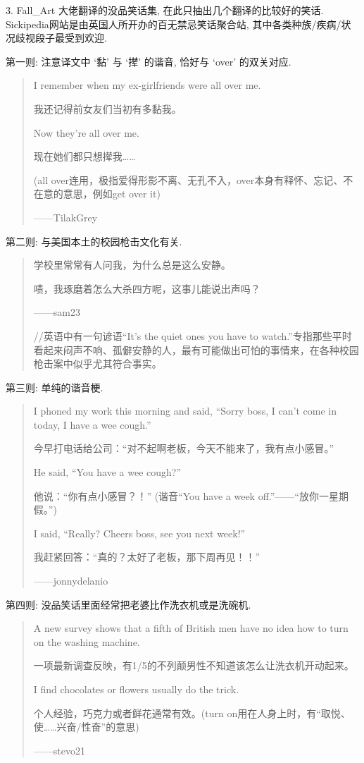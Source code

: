 \documentclass[a4paper, 12pt, UTF8]{article}
\begin{document}
3. Fall\_Art 大佬翻译的没品笑话集, 在此只抽出几个翻译的比较好的笑话. Sickipedia网站是由英国人所开办的百无禁忌笑话聚合站, 其中各类种族/疾病/状况歧视段子最受到欢迎.

第一则: 注意译文中 `黏' 与 `撵' 的谐音, 恰好与 `over' 的双关对应.

\begin{quote}
    I remember when my ex-girlfriends were all over me.
    
    我还记得前女友们当初有多黏我。
    
    Now they’re all over me.
    
    现在她们都只想撵我……
    
    (all over连用，极指爱得形影不离、无孔不入，over本身有释怀、忘记、不在意的意思，例如get over it)
    
    ——TilakGrey
\end{quote}

第二则: 与美国本土的校园枪击文化有关.

\begin{quote}
    学校里常常有人问我，为什么总是这么安静。
    
    啧，我琢磨着怎么大杀四方呢，这事儿能说出声吗？
    
    ——sam23
    
    //英语中有一句谚语“It’s the quiet ones you have to watch.”专指那些平时看起来闷声不响、孤僻安静的人，最有可能做出可怕的事情来，在各种校园枪击案中似乎尤其符合事实。
\end{quote}

第三则: 单纯的谐音梗.

\begin{quote}
    I phoned my work this morning and said, “Sorry boss, I can’t come in today, I have a wee cough.”
    
    今早打电话给公司：“对不起啊老板，今天不能来了，我有点小感冒。”
    
    He said, “You have a wee cough?”
    
    他说：“你有点小感冒？！” (谐音“You have a week off.”——“放你一星期假。”)
    
    I said, “Really? Cheers boss, see you next week!”
    
    我赶紧回答：“真的？太好了老板，那下周再见！！”
    
    ——jonnydelanio

\end{quote}

第四则: 没品笑话里面经常把老婆比作洗衣机或是洗碗机.

\begin{quote}
    A new survey shows that a fifth of British men have no idea how to turn on the washing machine.
    
    一项最新调查反映，有1/5的不列颠男性不知道该怎么让洗衣机开动起来。
    
    I find chocolates or flowers usually do the trick.
    
    个人经验，巧克力或者鲜花通常有效。(turn on用在人身上时，有“取悦、使……兴奋/性奋”的意思)
    
    ——stevo21
    
\end{quote}
\end{document}

